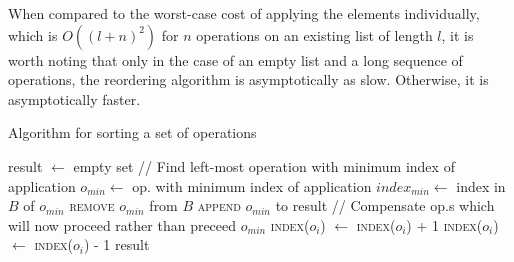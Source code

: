 When compared to the worst-case cost of applying the elements individually,
which is $O\left(\left(l+n\right)^2\right)$ for $n$ operations on an existing
list of length $l$, it is worth noting that only in the case of an empty list
and a long sequence of operations, the reordering algorithm is asymptotically as
slow. Otherwise, it is asymptotically faster.

\begin{algorithm}[!ht]
  \caption{Algorithm for sorting a set of operations}
  \label{alg:opsort}
  \begin{algorithmic}[5]
      \State result $\gets$ empty set
        \State // Find left-most operation with minimum index of application
        \State $o_{min} \gets$ op. with minimum index of application
        \State $index_{min} \gets$ index in $B$ of $o_{min}$
        \State \textsc{remove} $o_{min}$ from $B$
        \State \textsc{append} $o_{min}$ to result
        \Statex
        \State // Compensate op.s which will now proceed rather than
        preceed $o_{min}$
                \State \textsc{index}($o_i$) $\gets$ \textsc{index}($o_i$) + 1
                \State \textsc{index}($o_i$) $\gets$ \textsc{index}($o_i$) - 1
          \EndIf
        \EndFor
       \EndWhile
      \Statex
      \State \Return result
    \EndFunction
  \end{algorithmic}
\end{algorithm}
